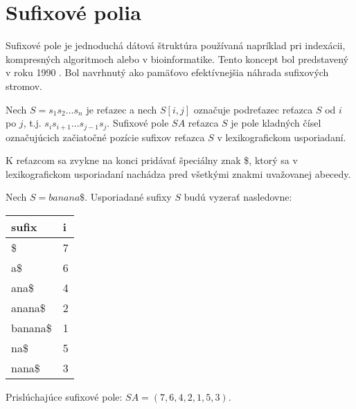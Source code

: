 
\section{Sufixové polia}

Sufixové pole je jednoduchá dátová štruktúra používaná napríklad pri indexácii,
kompresných algoritmoch alebo v bioinformatike. Tento koncept bol predstavený v
roku 1990 \cite{MM90}. Bol navrhnutý ako pamäťovo efektívnejšia náhrada
sufixových stromov.

\begin{defn}
    Nech $S = s_1 s_2 \ldots s_n$ je reťazec a nech $S[i, j]$ označuje
    podreťazec reťazca $S$ od $i$ po $j$, t.j. $s_i s_{i+1} \ldots s_{j-1} s_j$.
    Sufixové pole $SA$ reťazca $S$ je pole kladných čísel označujúcich začiatočné pozície sufixov reťazca $S$ v
    lexikografickom usporiadaní.
\end{defn}

K reťazcom sa zvykne na konci pridávať špeciálny znak \$, ktorý sa v
lexikografickom usporiadaní nachádza pred všetkými znakmi uvažovanej abecedy.

\begin{example}
    Nech $S = banana\$$. Usporiadané sufixy $S$ budú vyzerať nasledovne:
    
    \bigskip
    \begin{center}
        \begin{tabular}{ | l | l | }
            \hline
            \textbf{sufix} & \textbf{i} \\ \hline
            \$             & 7          \\ \hline
            a\$            & 6          \\ \hline
            ana\$          & 4          \\ \hline
            anana\$        & 2          \\ \hline
            banana\$       & 1          \\ \hline
            na\$           & 5          \\ \hline
            nana\$         & 3          \\ \hline
        \end{tabular}
    \end{center}
    \bigskip
    
    Prislúchajúce sufixové pole: $SA = (7, 6, 4, 2, 1, 5, 3)$.
\end{example}

